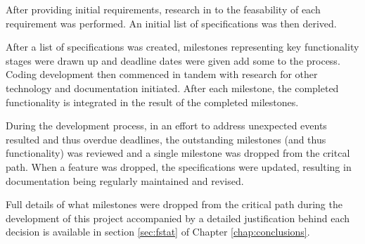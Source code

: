 After providing initial requirements, research in to the feasability of
each requirement was performed. An initial list of specifications was
then derived.


After a list of specifications was created, milestones representing key
functionality stages were drawn up and deadline dates were given add
some to  the process. Coding development then commenced in tandem with 
research for other technology and documentation initiated. After each
milestone, the completed functionality is integrated in the result of
the completed milestones.


During the development process, in an effort to address unexpected 
events resulted and thus overdue deadlines, the outstanding milestones 
(and thus functionality) was reviewed and a single milestone was 
dropped from the critcal path. When a feature was dropped, the 
specifications were updated, resulting in documentation being regularly 
maintained and revised.


Full details of what milestones were dropped from the critical path
during the development of this project accompanied by a detailed
justification behind each decision is available in 
section \ref{sec:fstat} of Chapter \ref{chap:conclusions}.
